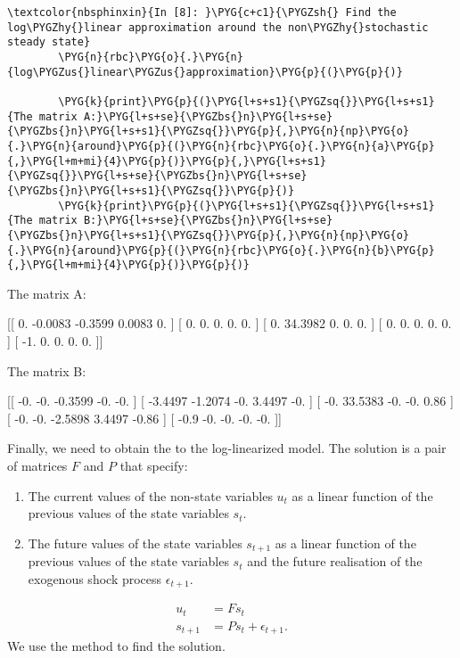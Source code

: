 \documentclass[letterpaper,10pt,openany,oneside,english]{sphinxmanual}
\begin{document}
\begin{Verbatim}[commandchars=\\\{\}]
\textcolor{nbsphinxin}{In [8]: }\PYG{c+c1}{\PYGZsh{} Find the log\PYGZhy{}linear approximation around the non\PYGZhy{}stochastic steady state}
        \PYG{n}{rbc}\PYG{o}{.}\PYG{n}{log\PYGZus{}linear\PYGZus{}approximation}\PYG{p}{(}\PYG{p}{)}
        
        \PYG{k}{print}\PYG{p}{(}\PYG{l+s+s1}{\PYGZsq{}}\PYG{l+s+s1}{The matrix A:}\PYG{l+s+se}{\PYGZbs{}n}\PYG{l+s+se}{\PYGZbs{}n}\PYG{l+s+s1}{\PYGZsq{}}\PYG{p}{,}\PYG{n}{np}\PYG{o}{.}\PYG{n}{around}\PYG{p}{(}\PYG{n}{rbc}\PYG{o}{.}\PYG{n}{a}\PYG{p}{,}\PYG{l+m+mi}{4}\PYG{p}{)}\PYG{p}{,}\PYG{l+s+s1}{\PYGZsq{}}\PYG{l+s+se}{\PYGZbs{}n}\PYG{l+s+se}{\PYGZbs{}n}\PYG{l+s+s1}{\PYGZsq{}}\PYG{p}{)}
        \PYG{k}{print}\PYG{p}{(}\PYG{l+s+s1}{\PYGZsq{}}\PYG{l+s+s1}{The matrix B:}\PYG{l+s+se}{\PYGZbs{}n}\PYG{l+s+se}{\PYGZbs{}n}\PYG{l+s+s1}{\PYGZsq{}}\PYG{p}{,}\PYG{n}{np}\PYG{o}{.}\PYG{n}{around}\PYG{p}{(}\PYG{n}{rbc}\PYG{o}{.}\PYG{n}{b}\PYG{p}{,}\PYG{l+m+mi}{4}\PYG{p}{)}\PYG{p}{)}
\end{Verbatim}
\begin{OriginalVerbatim}[commandchars=\\\{\}]
The matrix A:

 [[  0.      -0.0083  -0.3599   0.0083   0.    ]
 [  0.       0.       0.       0.       0.    ]
 [  0.      34.3982   0.       0.       0.    ]
 [  0.       0.       0.       0.       0.    ]
 [ -1.       0.       0.       0.       0.    ]]


The matrix B:

 [[ -0.      -0.      -0.3599  -0.      -0.    ]
 [ -3.4497  -1.2074  -0.       3.4497  -0.    ]
 [ -0.      33.5383  -0.      -0.       0.86  ]
 [ -0.      -0.      -2.5898   3.4497  -0.86  ]
 [ -0.9     -0.      -0.      -0.      -0.    ]]
\end{OriginalVerbatim}
Finally, we need to obtain the  to the log-linearized model.
The solution is a pair of matrices \(F\) and \(P\) that specify:
\begin{enumerate}
\item {} 
The current values of the non-state variables \(u_{t}\) as a
linear function of the previous values of the state variables
\(s_t\).

\item {} 
The future values of the state variables \(s_{t+1}\) as a linear
function of the previous values of the state variables \(s_t\)
and the future realisation of the exogenous shock process
\(\epsilon_{t+1}\).

\end{enumerate}
\label{\detokenize{examples:equation-examples:9}}\label{equation:examples:examples:9}\begin{align}
u_t  &  = Fs_t\\
s_{t+1} & = Ps_t + \epsilon_{t+1}.
\end{align}
We use the  method to find the solution.
\end{document}
